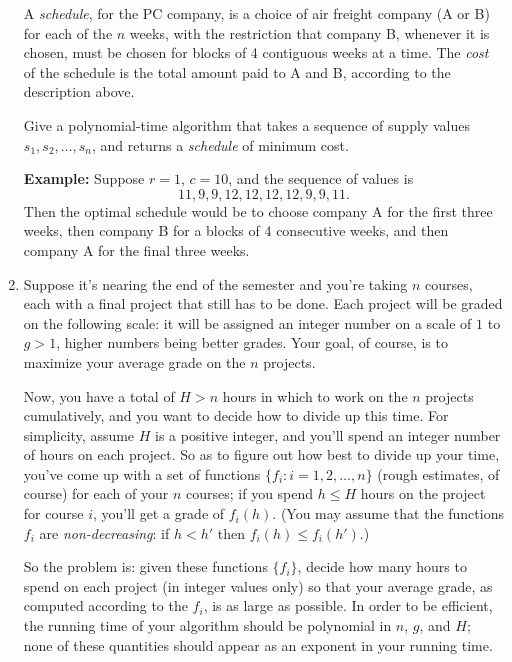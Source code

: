 \documentclass[12pt]{article}
\def\gap{0.2in}
\begin{document}
\begin{enumerate}
A {\em schedule}, for the PC company, is a choice of
air freight company (A or B) for each of the $n$ weeks,
with the restriction that company B, whenever it is chosen,
must be chosen for blocks of 4 contiguous weeks at a time.
The {\em cost} of the schedule is the total amount
paid to A and B, according to the description above.

\vskip \gap
Give a polynomial-time algorithm that
takes a sequence of supply values $s_1, s_2, \ldots, s_n$,
and returns a {\em schedule} of minimum cost.

\vskip \gap
{\bf Example:} Suppose $r = 1$, $c = 10$, and
the sequence of values is $$11, 9, 9, 12, 12, 12, 12, 9, 9, 11.$$
Then the optimal schedule would be to choose company A
for the first three weeks,
then company B for a blocks of 4 consecutive weeks,
and then company A for the final three weeks.


\item

Suppose it's nearing the end of the semester and
you're taking $n$ courses, each with a final project
that still has to be done.
Each project will be graded on the following scale:
it will be assigned an integer number on a scale of $1$ to $g > 1$,
higher numbers being better grades.
Your goal, of course, is to maximize your average grade
on the $n$ projects.

Now, you have a total of $H > n$ hours in which to work on
the $n$ projects cumulatively,
and you want to decide how to divide up this time.
For simplicity, assume $H$ is a positive integer, and you'll
spend an integer number of hours on each project.
So as to figure out how best to divide up your time,
you've come up with a set of functions $\{f_i : i = 1, 2, \ldots, n\}$
(rough estimates, of course) for each of your $n$ courses;
if you spend $h \leq H$ hours on the project for course $i$,
you'll get a grade of $f_i(h)$.
(You may assume that the functions $f_i$ are {\em non-decreasing}:
if $h < h'$ then $f_i(h) \leq f_i(h')$.)

So the problem is: given these functions $\{f_i\}$,
decide how many hours to spend on each project (in integer values only)
so that your average grade, as computed according to the $f_i$,
is as large as possible.
In order to be efficient, the running time of your
algorithm should be polynomial in $n$, $g$, and $H$; none of these
quantities should appear as an exponent in your running time.


\end{enumerate}
\end{document}
